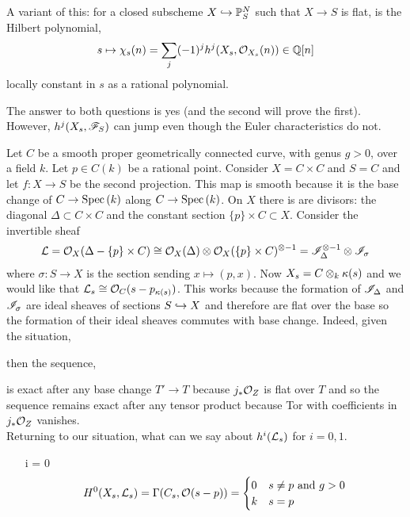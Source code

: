 \documentclass[12pt]{article}
\begin{document}
\begin{example}
A variant of this: for a closed subscheme $X \hookrightarrow \mathbb{P}^N_S$ such that $X \to S$ is flat, is the Hilbert polynomial,
\[ s \mapsto \chi_s(n) = \sum_{j} (-1)^j h^j(X_s, \mathcal{O}_{X_s}(n)) \in \mathbb{Q}[n] \]
locally constant in $s$ as a rational polynomial. 
\end{example}

The answer to both questions is yes (and the second will prove the first). However, $h^j(X_s, \mathscr{F}_S)$ can jump even though the Euler characteristics do not. 

\begin{example}
Let $C$ be a smooth proper geometrically connected curve, with genus $g > 0$, over a field $k$. Let $p \in C(k)$ be a rational point. Consider $X = C \times C$ and $S = C$ and let $f : X \to S$ be the second projection. This map is smooth because it is the base change of $C \to \mathrm{Spec}\left( k \right)$ along $C \to \mathrm{Spec}\left( k \right)$. On $X$ there is are divisors: the diagonal $\Delta \subset C \times C$ and the constant section $\{ p \} \times C \subset X$. Consider the invertible sheaf \[ \mathcal{L} = \mathcal{O}_{X}(\Delta - \{ p \} \times C) \cong \mathcal{O}_{X}(\Delta) \otimes \mathcal{O}_{X}(\{ p \} \times C)^{\otimes -1} = \mathscr{I}_\Delta^{\otimes -1} \otimes \mathscr{I}_{\sigma} \]
where $\sigma : S \to X$ is the section sending $x \mapsto (p, x)$. Now $X_s = C \otimes_k \kappa(s)$ and we would like that $\mathcal{L}_s \cong \mathcal{O}_{C}(s - p_{\kappa(s)})$. This works because the formation of $\mathscr{I}_\Delta$ and $\mathscr{I}_\sigma$ are ideal sheaves of sections $S \hookrightarrow X$ and therefore are flat over the base so the formation of their ideal sheaves commutes with base change. Indeed, given the situation,
\begin{center}
\end{center}
then the sequence,
\begin{center}
\end{center}
is exact after any base change $T' \to T$ because $j_* \mathcal{O}_{Z}$ is flat over $T$ and so the sequence remains exact after any tensor product because Tor with coefficients in $j_* \mathcal{O}_{Z}$ vanishes.
\bigskip\\
Returning to our situation, what can we say about $h^i(\mathcal{L}_s)$ for $i = 0,1$.
\begin{enumerate}
\item[i = 0] \[ H^0(X_s, \mathcal{L}_s) = \Gamma(C_s, \mathcal{O}_{}(s - p)) = 
\begin{cases}
0 & s \neq p \text{ and } g > 0
\\
k & s = p
\end{cases} \]


\end{enumerate}
\end{example}
\end{document}
